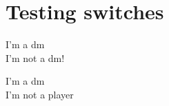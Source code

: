 \chapter{Testing switches}

\ifdm
  I'm a dm \\
\else
  I'm not a dm! \\
\fi

\ifplayer
  I'm a dm \\
\else
I'm not a player \\
\fi

